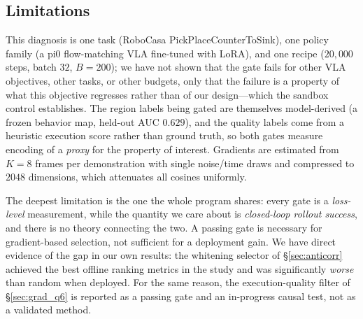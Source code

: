 \subsection{Limitations}
\label{sec:grad_limits}
This diagnosis is one task (RoboCasa PickPlaceCounterToSink), one policy family
(a pi0 flow-matching VLA fine-tuned with LoRA), and one recipe ($20{,}000$
steps, batch $32$, $B{=}200$); we have not shown that the gate fails for other
VLA objectives, other tasks, or other budgets, only that the failure is a
property of what this objective regresses rather than of our design---which the
sandbox control establishes. The region labels being gated are themselves
model-derived (a frozen behavior map, held-out AUC $0.629$), and the quality
labels come from a heuristic execution score rather than ground truth, so both
gates measure encoding of a \emph{proxy} for the property of interest. Gradients
are estimated from $K{=}8$ frames per demonstration with single noise/time
draws and compressed to $2048$ dimensions, which attenuates all cosines
uniformly.

The deepest limitation is the one the whole program shares: every gate is a
\emph{loss-level} measurement, while the quantity we care about is
\emph{closed-loop rollout success}, and there is no theory connecting the two.
A passing gate is necessary for gradient-based selection, not sufficient for a
deployment gain. We have direct evidence of the gap in our own results: the
whitening selector of \S\ref{sec:anticorr} achieved the best offline ranking
metrics in the study and was significantly \emph{worse} than random when
deployed. For the same reason, the execution-quality filter of
\S\ref{sec:grad_q6} is reported as a passing gate and an in-progress causal
test, not as a validated method.


